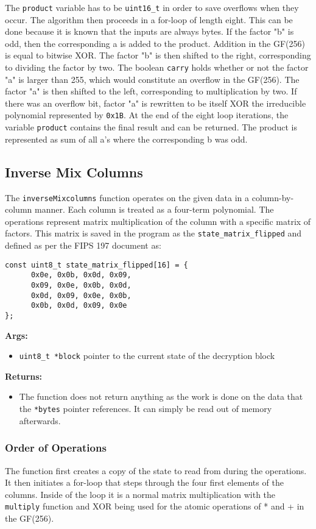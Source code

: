 The \lstinline{product} variable has to be \lstinline{uint16_t} in order to save overflows when they occur. The algorithm then proceeds in a for-loop of length eight. This can be done because it is known that the inputs are always bytes. If the factor "b" is odd, then the corresponding a is added to the product. Addition in the GF(256) is equal to bitwise XOR. The factor "b" is then shifted to the right, corresponding to dividing the factor by two. The boolean \lstinline{carry} holds whether or not the factor "a" is larger than 255, which would constitute an overflow in the GF(256). The factor "a" is then shifted to the left, corresponding to multiplication by two. If there was an overflow bit, factor "a" is rewritten to be itself XOR the irreducible polynomial represented by \lstinline{0x1B}. At the end of the eight loop iterations, the variable \lstinline{product} contains the final result and can be returned. The product is represented as sum of all a's where the corresponding b was odd.

\subsection{Inverse Mix Columns}
\label{ch:dec_inversemixcolumns}
The \lstinline{inverseMixcolumns} function operates on the given data in a column-by-column manner. Each column is treated as a four-term polynomial. The operations represent matrix multiplication of the column with a specific matrix of factors. This matrix is saved in the program as the \lstinline{state_matrix_flipped} and defined as per the FIPS 197 document as:
\begin{lstlisting}
const uint8_t state_matrix_flipped[16] = {
      0x0e, 0x0b, 0x0d, 0x09,
      0x09, 0x0e, 0x0b, 0x0d,
      0x0d, 0x09, 0x0e, 0x0b,
      0x0b, 0x0d, 0x09, 0x0e
};
\end{lstlisting}

\textbf{Args:}
\begin{itemize}
  \item \lstinline{uint8_t *block} pointer to the current state of the decryption block
\end{itemize}

\textbf{Returns:}
\begin{itemize}
  \item The function does not return anything as the work is done on the data that the \lstinline{*bytes} pointer references. It can simply be read out of memory afterwards.
\end{itemize}

\subsubsection{Order of Operations}
The function first creates a copy of the state to read from during the operations. It then initiates a for-loop that steps through the four first elements of the columns. Inside of the loop it is a normal matrix multiplication with the \lstinline{multiply} function and XOR being used for the atomic operations of * and + in the GF(256).
